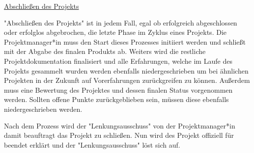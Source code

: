 \underline{Abschließen des Projekts}

"Abschließen des Projekts" ist in jedem Fall, egal ob erfolgreich abgeschlossen oder erfolglos abgebrochen, die letzte Phase im Zyklus eines Projekts. Die Projektmanager*in muss den Start dieses Prozesses initiiert werden und schließt mit der Abgabe des finalen Produkts ab. Weiters wird die restliche Projektdokumentation finalisiert und alle Erfahrungen, welche im Laufe des Projekts gesammelt wurden werden ebenfalls niedergeschrieben um bei ähnlichen Projekten in der Zukunft auf Vorerfahrungen zurückgreifen zu können. Außerdem muss eine Bewertung des Projektes und dessen finalen Status vorgenommen werden. Sollten offene Punkte zurückgeblieben sein, müssen diese ebenfalls niedergeschrieben werden.

Nach dem Prozess wird der "Lenkungsausschuss" von der Projektmanager*in damit beauftragt das Projekt zu schließen. Nun wird des Projekt offiziell für beendet erklärt und der "Lenkungsausschuss" löst sich auf. \cite{Prince2}
